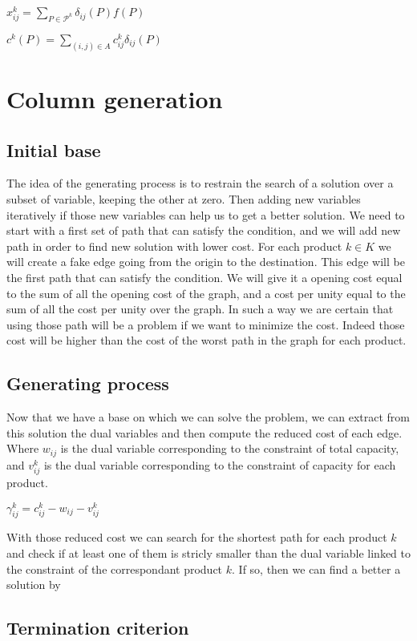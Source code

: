 $x^k_{ij} = \sum\limits_{P \in \mathcal{P}^k} \delta_{ij} (P) f(P)$

$c^k (P) = \sum\limits_{(i,j) \in A} c^k_{ij} \delta_{ij} (P)$


\section{Column generation}

\subsection{Initial base}
The idea of the generating process is to restrain the search of a solution over a subset of variable, keeping the other at zero. Then adding new variables iteratively if those new variables can help us to get a better solution. We need to start with a first set of path that can satisfy the condition, and we will add new path in order to find new solution with lower cost. For each product $k \in K$ we will create a fake edge going from the origin to the destination. This edge will be the first path that can satisfy the condition. We will give it a opening cost equal to the sum of all the opening cost of the graph, and a cost per unity equal to the sum of all the cost per unity over the graph. In such a way we are certain that using those path will be a problem if we want to minimize the cost. Indeed those cost will be higher than the cost of the worst path in the graph for each product.

\subsection{Generating process}

Now that we have a base on which we can solve the problem, we can extract from this solution the dual variables and then compute the reduced cost of each edge. Where $w_{ij}$ is the dual variable corresponding to the constraint of total capacity, and $v^k_{ij}$ is the dual variable corresponding to the constraint of capacity for each product.

 $\gamma^k_{ij}=c^k_{ij}-w_{ij}-v^k_{ij}$

With those reduced cost we can search for the shortest path for each product $k$ and check if at least one of them is stricly smaller than the dual variable linked to the constraint of the correspondant product $k$. If so, then we can find a better a solution by 

\subsection{Termination criterion}

